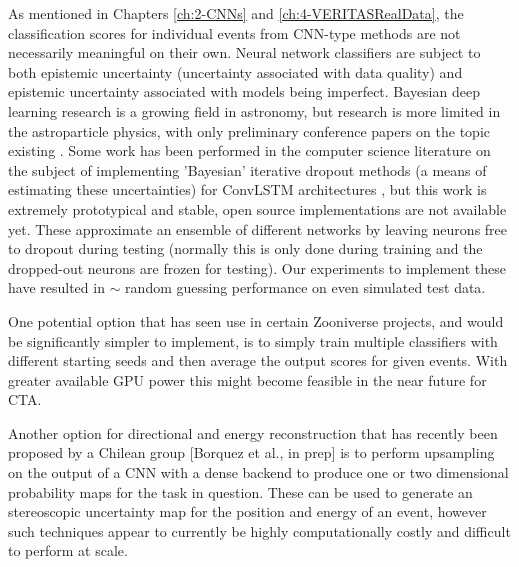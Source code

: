 As mentioned in Chapters \ref{ch:2-CNNs} and \ref{ch:4-VERITASRealData}, the classification scores for individual events from CNN-type methods are not necessarily meaningful on their own. Neural network classifiers are subject to both epistemic uncertainty (uncertainty associated with data quality) and epistemic uncertainty associated with models being imperfect. Bayesian deep learning research is a growing field in astronomy, but research is more limited in the astroparticle physics, with only preliminary conference papers on the topic existing \cite{bayesianwcd}. Some work has been performed in the computer science literature on the subject of implementing 'Bayesian' iterative dropout methods (a means of estimating these uncertainties) for ConvLSTM architectures \cite{bayesconv},  but this work is extremely prototypical and stable, open source implementations are not available yet. These approximate an ensemble of different networks by leaving neurons free to dropout during testing (normally this is only done during training and the dropped-out neurons are frozen for testing). Our experiments to implement these have resulted in $\sim$ random guessing performance on even simulated test data.

One potential option that has seen use in certain Zooniverse projects, and would be significantly simpler to implement, is to simply train multiple classifiers with different starting seeds and then average the output scores for given events. With greater available GPU power this might become feasible in the near future for CTA.

Another option for directional and energy reconstruction that has recently been proposed by a Chilean group [Borquez et al., in prep] is to perform upsampling on the output of a CNN with a dense backend to produce one or two dimensional probability maps for the task in question. These can be used to generate an stereoscopic uncertainty map for the position and energy of an event, however such techniques appear to currently be highly computationally costly and difficult to perform at scale.

